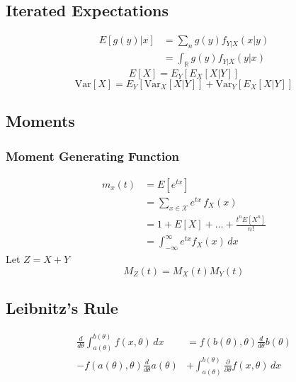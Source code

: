 	\subsection*{Iterated Expectations}
		\begin{equation*}
			\begin{split}
				E[g(y)|x]  
				&= \sum_{n} g(y)f_{Y|X}(x|y) \\
				&= \int_{\mathbb{R}} g(y)f_{Y|X}(y|x) 
			\end{split}
		\end{equation*}
		\[E[X] = E_Y[E_X[X|Y]]\]
		\[\text{Var}[X] = E_Y[\text{Var}_X[X|Y]] + \text{Var}_Y[E_X[X|Y]]\]
		
	\subsection*{Moments}
		\subsubsection*{Moment Generating Function}
			\begin{equation*}
				\begin{split}
					m_x(t) &= E[e^{tx}] \\
					&= \sum_{x\in\mathcal X} e^{tx}\,f_X(x) \\
					&= 1 + E[X] + \ldots + \frac{t^nE[X^n]}{n!} \\
					&= \int_{-\infty}^{\infty} e^{tx} f_X(x) \,dx
				\end{split}
			\end{equation*}
			Let \(Z=X+Y\)
			\[M_Z(t) = M_X(t)M_Y(t)\]
	
	\subsection*{Leibnitz's Rule}
		\begin{equation*}
			\begin{split}
				\frac{d}{d\theta} 
				\int^{b(\theta)}_{a(\theta)} f(x, \theta) \,dx
				&= f(b(\theta), \theta) \frac{d}{d\theta} b(\theta) \\
				- f(a(\theta), \theta) \frac{d}{d\theta} a(\theta)
				&+  \int^{b(\theta)}_{a(\theta)}\frac{\partial}{\partial\theta} f(x, \theta) \,dx
			\end{split}
		\end{equation*}
	
